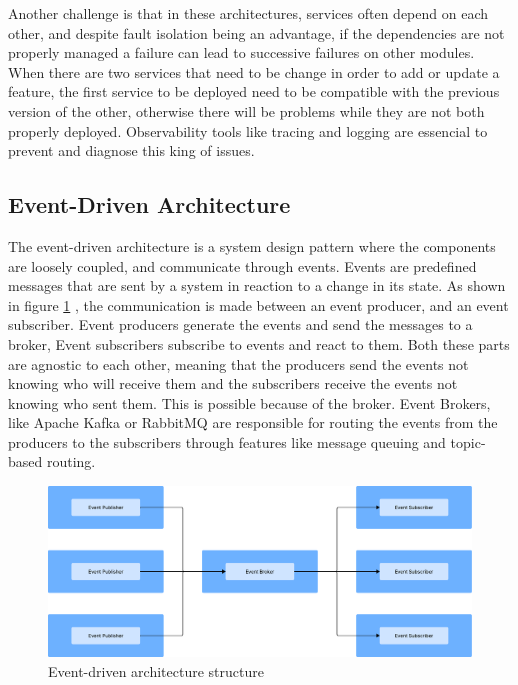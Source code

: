Another challenge is that in these architectures, services often depend on each other,
and despite fault isolation being an advantage, if the dependencies are not
properly managed a failure can lead to successive failures on other modules.
When there are two services that need to be change in order to add or update
a feature, the first service to be deployed need to be compatible with the
previous version of the other, otherwise there will be problems while they
are not both properly deployed.
Observability tools like tracing and logging are essencial to prevent and
diagnose this king of issues\cite{richards2015software}.

\subsection{Event-Driven Architecture}
The event-driven architecture is a system design pattern where the components
are loosely coupled, and communicate through events. Events are predefined
messages that are sent by a system in reaction to a change in its state.
As shown in figure \ref{fig:architectures:event-driven}
, the communication is made between an event producer, and an event subscriber.
Event producers generate the events and send the messages to a broker, Event
subscribers subscribe to events and react to them. Both these parts are agnostic
to each other, meaning that the producers send the events not knowing who will
receive them and the subscribers receive the events not knowing who sent them.
This is possible because of the broker. Event Brokers, like Apache Kafka or
RabbitMQ are responsible for routing the events from the producers to the
subscribers through features like message queuing and topic-based routing\cite{9226286,manchana2021event,AWSEventDriven}.

\begin{figure}[htbp]
	\centering
	\includegraphics[width=\textwidth, height=0.5\textheight, keepaspectratio]{Chapters/Figures/Architectures/Event-driven.pdf}
	\caption{Event-driven architecture structure}
	\label{fig:architectures:event-driven}
\end{figure}

